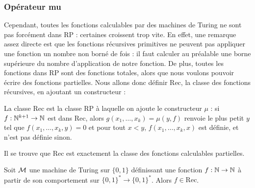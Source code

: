 \subsubsection{Opérateur mu}

Cependant, toutes les fonctions calculables par des machines de Turing ne sont pas forcément dans RP : certaines croissent trop vite. En effet, une remarque assez directe est que les fonctions récursives primitives ne peuvent pas appliquer une fonction un nombre non borné de fois : il faut calculer au préalable une borne supérieure du nombre d'application de notre fonction. De plus, toutes les fonctions dans RP sont des fonctions totales, alors que nous voulons pouvoir écrire des fonctions partielles. Nous allons donc définir Rec, la classe des fonctions récursives, en ajoutant un constructeur :

\begin{defi}
    La classe Rec est la classe RP à laquelle on ajoute le constructeur $\mu$ : si $f : \mathbb{N}^{k+1}\to\mathbb{N}$ est dans Rec, alors $g(x_1,\ldots,x_k)=\mu(y,f)$ renvoie le plus petit $y$ tel que $f(x_1,\ldots,x_k,y) = 0$ et pour tout $x<y$, $f(x_1,\ldots,x_k,x)$ est définie, et n'est pas définie sinon.
\end{defi}

Il se trouve que Rec est exactement la classe des fonctions calculables partielles.

\begin{them}
    Soit $\mathcal M$ une machine de Turing sur $\{0,1\}$ définissant une fonction $f : \mathbb{N} \to \mathbb{N}$ à partir de son comportement sur $\{0,1\}^*\to\{0,1\}^*$. Alors $f\in\mathrm{Rec}$.
\end{them}

